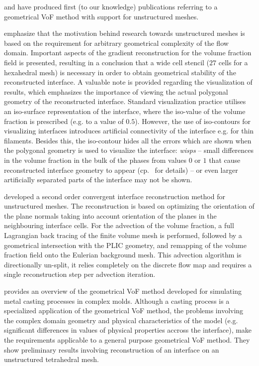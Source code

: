 \citet{Swarz1996} and \citet{KotheUnstructured1996} have produced first (to our
knowledge) publications referring to a geometrical VoF method with support for
unstructured meshes. 

\citet{KotheUnstructured1996} emphasize that the motivation behind research
towards unstructured meshes is based on the requirement for arbitrary
geometrical complexity of the flow domain. Important aspects of the gradient
reconstruction for the volume fraction field is presented, resulting in a
conclusion that a wide cell stencil ($27$ cells for a hexahedral mesh) is
necessary in order to obtain geometrical stability of the reconstructed
interface. A valuable note is provided regarding the visualization of results,
which emphasizes the importance of viewing the actual polygonal geometry of the
reconstructed interface. Standard visualization practice utilises an
iso-surface representation of the interface, where the iso-value of the volume
fraction is prescribed (e.g. to a value of $0.5$). However, the use of
iso-contours for visualizing interfaces introduces artificial connectivity of
the interface e.g. for thin filaments. Besides this, the iso-contour hides all
the errors which are shown when the polygonal geometry is used to visualize the
interface: \emph{wisps} -- small differences in the volume fraction in
the bulk of the phases from values $0$ or $1$ that cause reconstructed
interface geometry to appear (cp.\ \citet{HarvieFletcherStream2000} for
details) -- or even larger artificially separated parts of the interface 
may not be shown.

\citet{Swarz1996} developed a second order convergent interface reconstruction
method for unstructured meshes. The reconstruction is based on optimizing the
orientation of the plane normals taking into account orientation of the planes
in the neighbouring interface cells. For the advection of the volume fraction,
a full Lagrangian back tracing of the finite volume mesh is performed, followed
by a geometrical intersection with the PLIC geometry, and remapping of the
volume fraction field onto the Eulerian background mesh. This advection
algorithm is directionally un-split, it relies completely on the discrete flow
map and requires a single reconstruction step per advection iteration. 

\citet{KotheVoFchar1999} provides an overview of the geometrical VoF method
developed for simulating metal casting processes in complex molds. Although a
casting process is a specialized application of the geometrical VoF method, the
problems involving the complex domain geometry and physical characteristics of
the model (e.g. significant differences in values of physical properties
accross the interface), make the requirements applicable to a general purpose
geometrical VoF method. They show preliminary results involving reconstruction
of an interface on an unstructured tetrahedral mesh.

